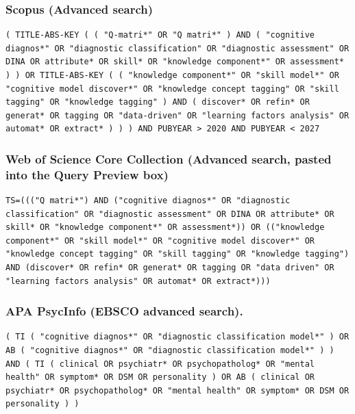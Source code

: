 \documentclass[sigconf,nonacm]{acmart}
\begin{document}
\subsubsection{Scopus (Advanced search)}

\begin{lstlisting}[style=searchquery]
( TITLE-ABS-KEY ( ( "Q-matri*" OR "Q matri*" ) AND ( "cognitive diagnos*" OR "diagnostic classification" OR "diagnostic assessment" OR DINA OR attribute* OR skill* OR "knowledge component*" OR assessment* ) ) OR TITLE-ABS-KEY ( ( "knowledge component*" OR "skill model*" OR "cognitive model discover*" OR "knowledge concept tagging" OR "skill tagging" OR "knowledge tagging" ) AND ( discover* OR refin* OR generat* OR tagging OR "data-driven" OR "learning factors analysis" OR automat* OR extract* ) ) ) AND PUBYEAR > 2020 AND PUBYEAR < 2027
\end{lstlisting}

\subsubsection{Web of Science Core Collection (Advanced search, pasted into the Query Preview box)}

\begin{lstlisting}[style=searchquery]
TS=((("Q matri*") AND ("cognitive diagnos*" OR "diagnostic classification" OR "diagnostic assessment" OR DINA OR attribute* OR skill* OR "knowledge component*" OR assessment*)) OR (("knowledge component*" OR "skill model*" OR "cognitive model discover*" OR "knowledge concept tagging" OR "skill tagging" OR "knowledge tagging") AND (discover* OR refin* OR generat* OR tagging OR "data driven" OR "learning factors analysis" OR automat* OR extract*)))
\end{lstlisting}

\subsubsection{APA PsycInfo (EBSCO advanced search).}

\begin{lstlisting}[style=searchquery]
( TI ( "cognitive diagnos*" OR "diagnostic classification model*" ) OR AB ( "cognitive diagnos*" OR "diagnostic classification model*" ) ) AND ( TI ( clinical OR psychiatr* OR psychopatholog* OR "mental health" OR symptom* OR DSM OR personality ) OR AB ( clinical OR psychiatr* OR psychopatholog* OR "mental health" OR symptom* OR DSM OR personality ) )
\end{lstlisting}
\end{document}
